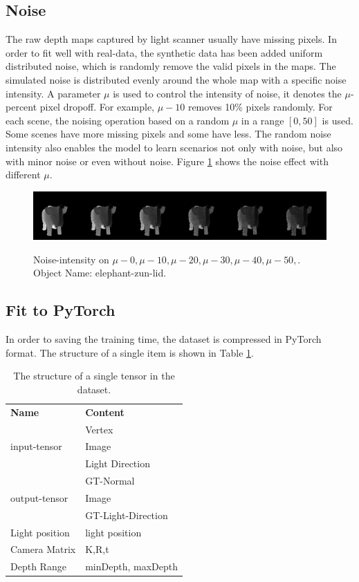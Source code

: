 \documentclass[border=15pt, multi, tikz]{article}
\newcommand{\tabhead}[1]{\textbf{#1}}
\begin{document}
\subsection{Noise}
\label{sec:noise}
The raw depth maps captured by light scanner usually have missing pixels. In order to fit well with real-data, the synthetic data has been added uniform distributed noise, which is randomly remove the valid pixels in the maps.
The simulated noise is distributed evenly around the whole map with a specific noise intensity. A parameter $ \mu $ is used to control the intensity of noise, it denotes the $ \mu $-percent pixel dropoff. For example, $ \mu-10 $ removes 10\% pixels randomly. For each scene, the noising operation based on a random $ \mu $ in a range $ \left[0, 50\right]  $ is used. Some scenes have more missing pixels and some have less. The random noise intensity also enables the model to learn scenarios not only with noise, but also with minor noise or even without noise.
Figure \ref{fig:noise-intensity} shows the noise effect with different $ \mu $.
\begin{figure}[!h]
	\centering
	{\includegraphics[width=.9\textwidth]{./Figures/add_noise_depth.png}}
	\caption{Noise-intensity on $ \mu-0, \mu-10,\mu-20, \mu-30, \mu-40, \mu-50,$. Object Name: elephant-zun-lid.}
	\label{fig:noise-intensity}
\end{figure}


\subsection{Fit to PyTorch}
In order to saving the training time, the dataset is compressed in PyTorch format. The structure of a single item is shown in Table \ref{tab:tensor-structure}.
\begin{table}[H]
	\caption{The structure of a single tensor in the dataset.}
	\label{tab:tensor-structure}
	\centering
	\begin{tabular}{l | l}
		\tabhead{Name} & \tabhead{Content} \\
		\multirow{3}{*}{input-tensor}  & Vertex \\  & Image \\  & Light Direction \\
		\hline
		\multirow{3}{*}{output-tensor}  & GT-Normal \\ & Image \\ & GT-Light-Direction \\
		\hline
		Light position & light position \\
		\hline 
		Camera Matrix  & K,R,t\\
		\hline 
		Depth Range  & minDepth, maxDepth\\
	\end{tabular}
\end{table}
\end{document}
